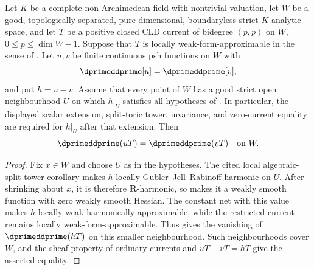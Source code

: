 \begin{corollary}
\label{cor:p213-algebraic-split-scalar-stable-weak-form-bt}
Let \(K\) be a complete non-Archimedean field with nontrivial valuation,
let \(W\) be a good, topologically separated, pure-dimensional,
boundaryless strict \(K\)-analytic space, and let \(T\) be a positive
closed CLD current of bidegree \((p,p)\) on \(W\),
\(0\leq p\leq\dim W-1\).  Suppose that \(T\) is locally
weak-form-approximable in the sense of
.  Let \(u,v\) be finite
continuous psh functions on \(W\) with
\[
                         \dprimeddprime[u]=\dprimeddprime[v],
\]
and put \(h=u-v\).  Assume that every point of \(W\) has a good strict
open neighbourhood \(U\) on which \(h|_U\) satisfies all hypotheses of
.
In particular, the displayed scalar extension, split-toric tower,
invariance, and zero-current equality are required for \(h|_U\) after
that extension.  Then
\[
                         \dprimeddprime(uT)=\dprimeddprime(vT)
                         \quad\text{on }W.
\]
\end{corollary}

\begin{proof}
Fix \(x\in W\) and choose \(U\) as in the hypotheses.  The cited local
algebraic-split tower corollary makes \(h\) locally
Gubler--Jell--Rabinoff harmonic on \(U\).  After shrinking about \(x\), it
is therefore \(\mathbf R\)-harmonic, so
\cite[Proposition~10.17]{GJR26} makes it a weakly smooth function with zero
weakly smooth Hessian.  The constant net with this value makes \(h\)
locally weak-harmonically approximable, while the restricted current remains
locally weak-form-approximable.  Thus
 gives the vanishing of
\(\dprimeddprime(hT)\) on this smaller neighbourhood.  Such neighbourhoods
cover \(W\), and the sheaf property of ordinary currents and \(uT-vT=hT\)
give the asserted equality.
\end{proof}

